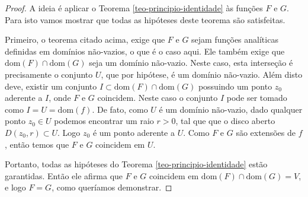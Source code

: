 \begin{proof}
A ideia é aplicar o  Teorema \ref{teo-principio-identidade} às funções $F$ e $G$.
Para isto vamos mostrar que todas as hipóteses deste teorema são satisfeitas. 

Primeiro, o teorema citado acima, 
exige que $F$ e $G$ sejam funções analíticas definidas em domínios não-vazios, 
o que é o caso aqui. Ele também exige que $\mathrm{dom}(F)\cap\mathrm{dom}(G)$
seja um domínio não-vazio. Neste caso, esta interseção é precisamente o conjunto $U$,
que por hipótese, é um domínio não-vazio.
Além disto deve, existir um conjunto $I\subset \mathrm{dom}(F)\cap\mathrm{dom}(G)$
possuindo um ponto $z_0$ aderente a $I$, onde $F$ e $G$ coincidem. Neste 
caso o conjunto $I$ pode ser tomado como $I=U=\mathrm{dom}(f)$. De fato,
como $U$ é um domínio não-vazio, dado qualquer ponto $z_0\in U$ 
podemos encontrar um raio $r>0$, tal que que o disco aberto $D(z_0,r)\subset U$.
Logo $z_0$ é um ponto aderente a $U$. Como $F$ e $G$ são extensões de $f$, 
então temos que $F$ e $G$ coincidem em $U$.

Portanto, todas as hipóteses do Teorema 
\ref{teo-principio-identidade} estão garantidas. 
Então ele afirma que $F$ e $G$ coincidem 
em $\mathrm{dom}(F)\cap\mathrm{dom}(G)= V$, e logo $F=G$,
como queríamos demonstrar.
\end{proof}






